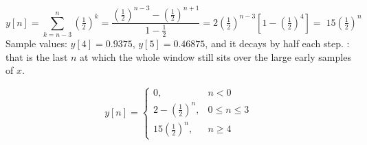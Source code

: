 \[ y[n]=\sum_{k=n-3}^{n}\left(\tfrac12\right)^k
       =\frac{\left(\frac12\right)^{n-3}-\left(\frac12\right)^{n+1}}{1-\frac12}
       =2\left(\tfrac12\right)^{n-3}\left[1-\left(\tfrac12\right)^{4}\right]
       =\boxed{\;15\left(\tfrac12\right)^{n}\;} \]
{\color{sub}\footnotesize Sample values: $y[4]=0.9375$, $y[5]=0.46875$, and it decays by half
each step. : that is the last $n$ at which the whole window still
sits over the large early samples of $x$.}

\[ y[n]=\begin{cases}
   0, & n<0\\[2pt]
   2-\left(\frac12\right)^{n}, & 0\le n\le3\\[2pt]
   15\left(\frac12\right)^{n}, & n\ge4
\end{cases} \]

